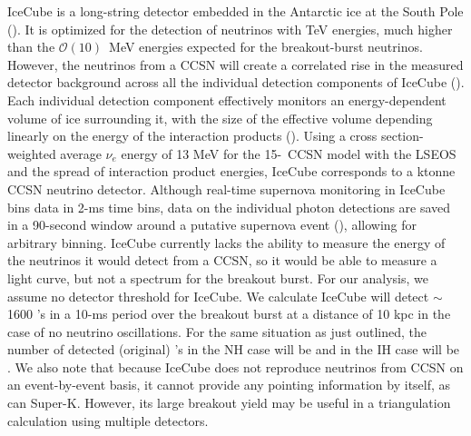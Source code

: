 IceCube is a long-string detector embedded in the Antarctic ice at the
South Pole (\citealp{achterbergetal2006,abbasi2010}). It
is optimized for the detection of neutrinos with TeV energies, much
higher than the $\mathcal{O}(10)$~MeV energies expected for the
breakout-burst neutrinos. 
However, the
neutrinos from a CCSN will create a correlated rise in the measured
detector background across all the individual detection components of IceCube
(\citealp{pryoretal1988,halzenetal1996}).  
Each individual detection component effectively monitors 
an energy-dependent volume of ice surrounding it, with the 
size of the effective volume depending linearly on the 
energy of the interaction products (\citealt{abbasietal2011}).  
Using a cross section-weighted average $\nu_e$ energy of 13 MeV 
for the 15-\Msol\ CCSN model with the LSEOS and the spread of interaction 
product energies, IceCube corresponds to a  ktonne 
CCSN neutrino detector.
Although real-time supernova monitoring in IceCube bins data 
in 2-ms time bins, data on the individual photon detections 
are saved in a 90-second window around a putative supernova 
event (\citealt{aartsenetal2013}), allowing for arbitrary binning.
IceCube
currently lacks the ability to measure the energy of the neutrinos it
would detect from a CCSN, so it would be able to measure a light curve, but
not a spectrum for the breakout burst.  For our analysis, we assume no
detector threshold for IceCube.  We calculate 
IceCube  will detect 
$\sim$1600 \nue's in a 10-ms period over the
breakout burst at a distance of 10 kpc in the case of no neutrino
oscillations.  For the same situation as just outlined, the number of
detected (original) \nue's in the NH case will be  and in the IH
case will be .  We also note that because
IceCube does not reproduce neutrinos from CCSN on an event-by-event
basis, it cannot provide any pointing information by itself, as can
Super-K.  However, its large breakout yield may be useful
in a triangulation calculation using multiple detectors.


